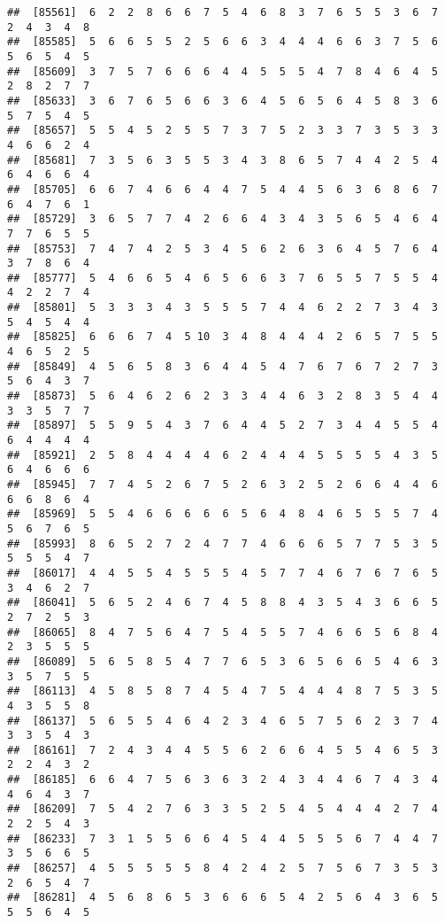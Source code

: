 \documentclass[
]{book}
\begin{document}
\begin{verbatim}
##  [85561]  6  2  2  8  6  6  7  5  4  6  8  3  7  6  5  5  3  6  7  2  4  3  4  8
##  [85585]  5  6  6  5  5  2  5  6  6  3  4  4  4  6  6  3  7  5  6  5  6  5  4  5
##  [85609]  3  7  5  7  6  6  6  4  4  5  5  5  4  7  8  4  6  4  5  2  8  2  7  7
##  [85633]  3  6  7  6  5  6  6  3  6  4  5  6  5  6  4  5  8  3  6  5  7  5  4  5
##  [85657]  5  5  4  5  2  5  5  7  3  7  5  2  3  3  7  3  5  3  3  4  6  6  2  4
##  [85681]  7  3  5  6  3  5  5  3  4  3  8  6  5  7  4  4  2  5  4  6  4  6  6  4
##  [85705]  6  6  7  4  6  6  4  4  7  5  4  4  5  6  3  6  8  6  7  6  4  7  6  1
##  [85729]  3  6  5  7  7  4  2  6  6  4  3  4  3  5  6  5  4  6  4  7  7  6  5  5
##  [85753]  7  4  7  4  2  5  3  4  5  6  2  6  3  6  4  5  7  6  4  3  7  8  6  4
##  [85777]  5  4  6  6  5  4  6  5  6  6  3  7  6  5  5  7  5  5  4  4  2  2  7  4
##  [85801]  5  3  3  3  4  3  5  5  5  7  4  4  6  2  2  7  3  4  3  5  4  5  4  4
##  [85825]  6  6  6  7  4  5 10  3  4  8  4  4  4  2  6  5  7  5  5  4  6  5  2  5
##  [85849]  4  5  6  5  8  3  6  4  4  5  4  7  6  7  6  7  2  7  3  5  6  4  3  7
##  [85873]  5  6  4  6  2  6  2  3  3  4  4  6  3  2  8  3  5  4  4  3  3  5  7  7
##  [85897]  5  5  9  5  4  3  7  6  4  4  5  2  7  3  4  4  5  5  4  6  4  4  4  4
##  [85921]  2  5  8  4  4  4  4  6  2  4  4  4  5  5  5  5  4  3  5  6  4  6  6  6
##  [85945]  7  7  4  5  2  6  7  5  2  6  3  2  5  2  6  6  4  4  6  6  6  8  6  4
##  [85969]  5  5  4  6  6  6  6  6  5  6  4  8  4  6  5  5  5  7  4  5  6  7  6  5
##  [85993]  8  6  5  2  7  2  4  7  7  4  6  6  6  5  7  7  5  3  5  5  5  5  4  7
##  [86017]  4  4  5  5  4  5  5  5  4  5  7  7  4  6  7  6  7  6  5  3  4  6  2  7
##  [86041]  5  6  5  2  4  6  7  4  5  8  8  4  3  5  4  3  6  6  5  2  7  2  5  3
##  [86065]  8  4  7  5  6  4  7  5  4  5  5  7  4  6  6  5  6  8  4  2  3  5  5  5
##  [86089]  5  6  5  8  5  4  7  7  6  5  3  6  5  6  6  5  4  6  3  3  5  7  5  5
##  [86113]  4  5  8  5  8  7  4  5  4  7  5  4  4  4  8  7  5  3  5  4  3  5  5  8
##  [86137]  5  6  5  5  4  6  4  2  3  4  6  5  7  5  6  2  3  7  4  3  3  5  4  3
##  [86161]  7  2  4  3  4  4  5  5  6  2  6  6  4  5  5  4  6  5  3  2  2  4  3  2
##  [86185]  6  6  4  7  5  6  3  6  3  2  4  3  4  4  6  7  4  3  4  4  6  4  3  7
##  [86209]  7  5  4  2  7  6  3  3  5  2  5  4  5  4  4  4  2  7  4  2  2  5  4  3
##  [86233]  7  3  1  5  5  6  6  4  5  4  4  5  5  5  6  7  4  4  7  3  5  6  6  5
##  [86257]  4  5  5  5  5  5  8  4  2  4  2  5  7  5  6  7  3  5  3  2  6  5  4  7
##  [86281]  4  5  6  8  6  5  3  6  6  6  5  4  2  5  6  4  3  6  5  5  5  6  4  5

\end{verbatim}
\end{document}
